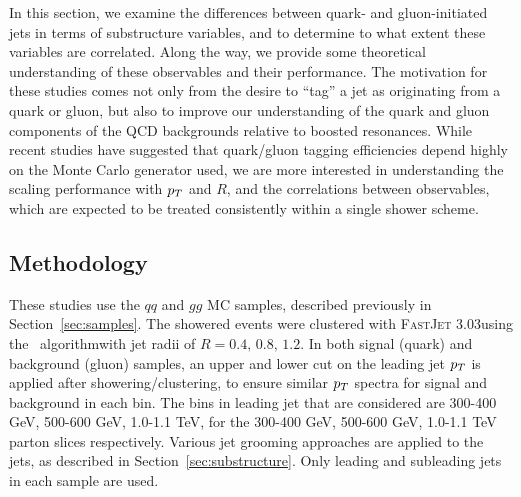 In this section, we examine the differences between quark- and
gluon-initiated jets in terms of substructure variables, and to
determine to what extent these variables are correlated. Along the
way, we provide some theoretical understanding of these
observables and their performance. The motivation for these studies
 comes not only from the
desire to ``tag'' a jet as originating from a quark or gluon, but also
to improve our  understanding of the quark and gluon components of the
QCD backgrounds relative to boosted resonances.  While recent studies
have suggested that quark/gluon tagging efficiencies depend highly on
the Monte Carlo generator used, we are more interested in
understanding the scaling performance with $p_T$ and $R$, and the
correlations between observables, which are expected to be treated
consistently within a single shower scheme.

\subsection{Methodology}

These studies use the $qq$ and $gg$ MC samples, described previously in Section~\ref{sec:samples}. 
The showered events were clustered with \textsc{FastJet}
3.03 using
the \antikt~algorithm with jet radii of $R = 0.4,\, 0.8,\, 1.2$. In
both signal (quark) and background (gluon) samples, an upper and lower cut on
the leading jet $p_T$ is applied after showering/clustering, to ensure
similar $p_T$ spectra for signal and background in each \pt bin. The bins
in leading jet \pt that are considered are 300-400 GeV, 500-600 GeV,
1.0-1.1 TeV, for the 300-400 GeV, 500-600 GeV,
1.0-1.1 TeV parton \pt slices respectively. 
Various jet grooming approaches are applied to the jets, as described in Section~\ref{sec:substructure}. 
Only leading and subleading jets in each sample are used. 


